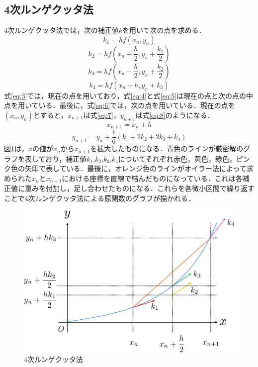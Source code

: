 \documentclass[a4paper, 12pt]{ltjsarticle}
\begin{document}
\subsection{4次ルンゲクッタ法}
4次ルンゲクッタ法では，次の補正値$k$を用いて次の点を求める．
\begin{equation}
  k_1=hf(x_n,y_n)\label{eq:3}
\end{equation}
\begin{equation}
  k_2=hf(x_n+\frac{h}{2},y_n+\frac{k_1}{2})\label{eq:4}
\end{equation}
\begin{equation}
  k_3=hf(x_n+\frac{h}{2},y_n+\frac{k_2}{2})\label{eq:5}
\end{equation}
\begin{equation}
  k_4=hf(x_n+h,y_n+k_3)\label{eq:6}
\end{equation}
式\eqref{eq:3}では，現在の点を用いており，式\eqref{eq:4}と式\eqref{eq:5}は現在の点と次の点の中点を用いている．最後に，式\eqref{eq:6}では，次の点を用いている．現在の点を$(x_n,y_n)$とすると，$x_{n+1}$は式\eqref{eq:7}，$y_{n+1}$は式\eqref{eq:8}のようになる．
\begin{equation}
  x_{n+1}=x_n+h\label{eq:7}
\end{equation}
\begin{equation}
  y_{n+1}=y_n+\frac{1}{6}(k_1+2k_2+2k_3+k_4)\label{eq:8}
\end{equation}
\clearpage
図\ref{fig:4次ルンゲクッタ法}は，$x$の値が$x_n$から$x_{n+1}$を拡大したものになる．青色のラインが厳密解のグラフを表しており，補正値$k_1$,$k_2$,$k_3$,$k_4$についてそれぞれ赤色，黄色，緑色，ピンク色の矢印で表している．最後に，オレンジ色のラインがオイラー法によって求められた$x_n$と$x_{n+1}$における座標を直線で結んだものになっている．これは各補正値に重みを付加し，足し合わせたものになる．これらを各微小区間で繰り返すことで4次ルンゲクッタ法による原関数のグラフが描かれる．
\begin{figure}[h]
\begin{center}
\includegraphics[clip,width=\textwidth,keepaspectratio]{runge-kutta.pdf}
\end{center}
\caption{4次ルンゲクッタ法}
\label{fig:4次ルンゲクッタ法}
\end{figure}
\clearpage
\end{document}
